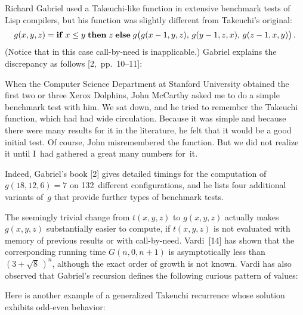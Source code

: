 \documentclass{article}
\begin{document}
Richard Gabriel used a Takeuchi-like function in extensive benchmark tests of
 Lisp compilers, but his function was slightly different from
Takeuchi's original:
$$g(x,y,z)={\bf if}\;x\leq y\;{\bf then}\;z\;{\bf else}\;
g\bigl(g(x-1,y,z),\,g(y-1,z,x),\,g(z-1,x,y)\bigr)\,.$$
(Notice that in this case call-by-need is inapplicable.) Gabriel
explains the discrepancy as follows [2,~pp.\ 10--11]:

{\narrower\smallskip\noindent
When the Computer Science Department at Stanford University obtained
the first two or three Xerox Dolphins, John McCarthy asked me to do a
simple benchmark test with him. We sat down, and he tried to remember
the Takeuchi function, which had had wide circulation. Because it was
simple and because there were many results for it in the literature,
he felt that it would be a good initial test. Of course, John
misremembered the function. But we did not realize it until I~had
gathered a great many numbers for~it.
\smallskip}

\noindent
Indeed, Gabriel's book [2] gives detailed timings for the
computation of $g(18,12,6)=7$ on 132~different configurations, and he
lists four additional variants of~$g$ that provide further types of
benchmark tests.

The seemingly trivial change from $t(x,y,z)$ to $g(x,y,z)$ actually
makes $g(x,y,z)$ substantially easier to compute, if $t(x,y,z)$ is not
evaluated with memory of previous results or with call-by-need. Vardi~[14]
 has shown that the corresponding running time $G(n,0,n+1)$ is
asymptotically less than $(3+\sqrt{8}\,)^n$, although the exact
order of growth is not known.
Vardi has also observed that Gabriel's recursion defines the following
curious pattern of values:

\smallskip
{}

Here is another example of a generalized Takeuchi recurrence whose
solution  exhibits odd-even behavior:

\smallskip
{}
\end{document}
